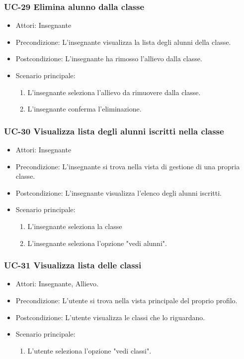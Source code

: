 \subsubsection{UC-29 Elimina alunno dalla classe}		
\begin{itemize}
	\item Attori: Insegnante
	\item Precondizione: L'insegnante visualizza la lista degli alunni della classe.
	\item Postcondizione: L'insegnante ha rimosso l'allievo dalla classe.
	\item Scenario principale:
	\begin{enumerate}
		\item L'insegnante seleziona l'allievo da rimuovere dalla classe.
		\item L'insegnante conferma l'eliminazione.
	\end{enumerate}		
\end{itemize}

\subsubsection{UC-30 Visualizza lista degli alunni iscritti nella classe}		
\begin{itemize}
	\item Attori: Insegnante
	\item Precondizione: L'insegnante si trova nella vista di gestione di una propria classe.
	\item Postcondizione: L'insegnante visualizza l'elenco degli alunni iscritti.
	\item Scenario principale:
	\begin{enumerate}
		\item L'insegnante seleziona la classe
		\item L'insegnante seleziona l'opzione "vedi alunni".
	\end{enumerate}		
\end{itemize}

\subsubsection{UC-31 Visualizza lista delle classi}		
\begin{itemize}
	\item Attori: Insegnante, Allievo.
	\item Precondizione: L'utente si trova nella vista principale del proprio profilo.
	\item Postcondizione: L'utente visualizza le classi che lo riguardano.
	\item Scenario principale:
	\begin{enumerate}
		\item L'utente seleziona l'opzione "vedi classi".
	\end{enumerate}		
\end{itemize}

